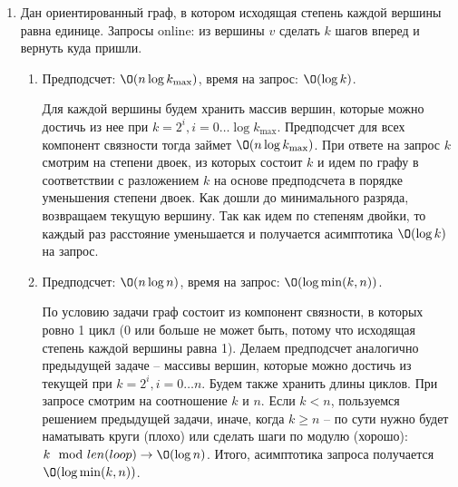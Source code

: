 \begin{enumerate}
  \item
    Дан ориентированный граф, в котором исходящая степень каждой вершины
	равна единице. Запросы online: из вершины $v$ сделать $k$ шагов вперед и вернуть куда пришли.
	\begin{enumerate}
	  \item Предподсчет: $\O(n \log k_{\max})$, время на запрос: $\O(\log k)$.
	  \begin{solution}
		Для каждой вершины будем хранить массив вершин, которые можно достичь из нее при $k=2^i, i = 0 \ldots \log k_{\max}$. Предподсчет для всех компонент связности тогда займет $\O(n \log k_{\max})$. При ответе на запрос $k$ смотрим на степени двоек, из которых состоит $k$ и идем по графу в соответствии с разложением $k$ на основе предподсчета в порядке уменьшения степени двоек. Как дошли до минимального разряда, возвращаем текущую вершину. Так как идем по степеням двойки, то каждый раз расстояние уменьшается и получается асимптотика $\O(\log k)$ на запрос.
	  \end{solution}
	  \item Предподсчет: $\O(n \log n)$, время на запрос: $\O(\log \min(k, n))$.      
	  \begin{solution}
		По условию задачи граф состоит из компонент связности, в которых ровно 1 цикл (0 или больше не может быть, потому что исходящая степень каждой вершины равна 1). Делаем предподсчет аналогично предыдущей задаче -- массивы вершин, которые можно достичь из текущей при $k=2^i, i = 0 \ldots n$. Будем также хранить длины циклов. При запросе смотрим на соотношение $k$ и $n$. Если $k < n$, пользуемся решением предыдущей задачи, иначе, когда $k \geq n$ -- по сути нужно будет наматывать круги (плохо) или сделать шаги по модулю (хорошо): $k \mod len(loop) \rightarrow \O(\log n)$. Итого, асимптотика запроса получается $\O(\log \min(k, n))$.
	  \end{solution}
	\end{enumerate}
	

\end{enumerate}
